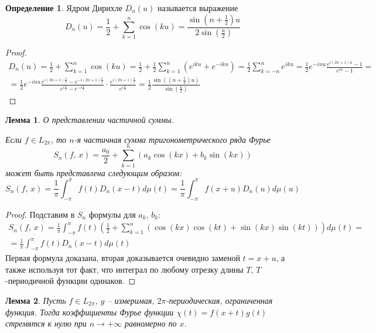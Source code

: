 \documentclass[a4paper,12pt]{article}
\theoremstyle{plain}
\newtheorem{lemma}{Лемма}[section]
\theoremstyle{definition}
\newtheorem{definition}{Определение}[section]
\theoremstyle{remark}
\begin{document}
\begin{definition}
	Ядром Дирихле $D_n(u)$ называется выражение
	\[D_n(u) = \frac{1}{2} + \sum_{k = 1}^n \cos(ku) = \frac{\sin (n + \frac{1}{2})u}{2\sin(\frac{u}{2})}\]
\end{definition}

\begin{proof}
	\begin{align*}
		D_n(u) = \frac{1}{2} + \sum_{k = 1}^n \cos(ku) = \frac{1}{2} + \frac{1}{2}\sum_{k = 1}^n (e^{iku} + e^{-iku}) = \frac{1}{2}\sum_{k = -n}^n e^{iku} = \frac{1}{2}e^{-inu}\frac{e^{i(2n + 1)u} - 1}{e^{iu} - 1} = \\
		= \frac{1}{2}e^{-inu}\frac{e^{i(2n + 1)\frac{u}{2}} - e^{-i(2n + 1)\frac{u}{2}}}{e^{i\frac{u}{2}} - e^{-i\frac{u}{2}}}\cdot\frac{e^{i(2n + 1)\frac{u}{2}}}{e^{i\frac{u}{2}}} = \frac{1}{2}\frac{\sin((n + \frac{1}{2})u)}{\sin(\frac{u}{2})}
	\end{align*}
\end{proof}

\begin{lemma}
	О представлении частичной суммы.

	Если $f \in L_{2\pi}$, то $n$-я частичная сумма тригонометрического ряда Фурье
	\[S_n(f,\,x) = \frac{a_0}{2} + \sum_{k = 1}^n (a_k \cos(kx) + b_k\sin(kx))\]
	может быть представлена следующим образом:
	\[S_n(f,\,x) = \frac{1}{\pi}\int_{-\pi}^\pi f(t)D_n(x - t)d\mu(t) = \frac{1}{\pi}\int_{-\pi}^\pi f(x + u)D_n(u)d\mu(u)\]
\end{lemma}

\begin{proof}
	Подставим в $S_n$ формулы для $a_k,\, b_k$:
	\begin{align*}
		S_n(f,\,x) = \frac{1}{\pi}\int_{-\pi}^\pi f(t) \left(\frac{1}{2} + \sum_{k = 1}^n (\cos(kx)\cos(kt) + \sin(kx)\sin(kt))\right)d\mu(t) = \\
		= \frac{1}{\pi}\int_{-\pi}^\pi f(t)D_n(x-t)d\mu(t)
	\end{align*}
	Первая формула доказана, вторая доказывается очевидно заменой $t = x + u$, а также используя тот факт, что интеграл по любому отрезку длины $T$, $T$-периодичной функции одинаков.
\end{proof}

\begin{lemma}
	\label{RAVN_COEF}
	Пусть $f \in L_{2\pi}$, $g$ -- измеримая, $2\pi$-периодическая, ограниченная функция. Тогда коэффициенты Фурье функции $\chi(t) = f(x + t)g(t)$ стремятся к нулю при $n \to +\infty$ равномерно по $x$.
\end{lemma}
\end{document}
